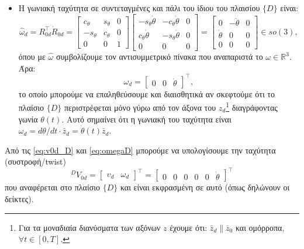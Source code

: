 \documentclass[12pt]{article} %
\numberwithin{equation}{section}  %
\begin{document}
\begin{itemize}[nolistsep, noitemsep]
    \item Η γωνιακή ταχύτητα σε συντεταγμένες και πάλι του ίδιου του πλαισίου $\{D\}$ είναι:
    \begin{equation}\label{eq:omegahatD}
        \widehat{\omega}_d = R_{0d}^{\top} \dot{R}_{0d} = 
        \begin{bmatrix}
            c_\theta  & s_\theta & 0 \\
            -s_\theta & c_\theta & 0 \\
            0 &         0      &  1
        \end{bmatrix} \begin{bmatrix}
            -s_\theta \dot\theta  &  -c_\theta \dot\theta &  0 \\
            c_\theta  \dot\theta &  -s_\theta  \dot\theta &  0 \\
            0          &  0          &  0
        \end{bmatrix} = \begin{bmatrix}
            0          &  -\dot\theta          &  0 \\
            \dot\theta          &  0           &  0 \\
            0          &  0           &  0
        \end{bmatrix}
        \in so(3),
    \end{equation}
    όπου με $\widehat{\omega}$ συμβολίζουμε τον αντισυμμετρικό πίνακα που αναπαριστά το $\omega \in \mathbb{R}^3$. Άρα:
    \begin{equation}\label{eq:omegaD}
        \omega_d = \begin{bmatrix}
            0  & 0  &  \dot\theta 
        \end{bmatrix}^{\top},
    \end{equation}
    το οποίο μπορούμε να επαληθεύσουμε και διαισθητικά αν σκεφτούμε ότι το πλαίσιο $\{D\}$ περιστρέφεται μόνο γύρω από τον άξονα του $z_d$\footnote{Για τα μοναδιαία διανύσματα  των αξόνων $z$ έχουμε ότι: $\bar{z}_d \parallel \bar{z}_0$ και ομόρροπα, $\forall t \in [0, T]$.} διαγράφοντας γωνία $\theta(t)$. 
    Αυτό σημαίνει ότι η γωνιακή του ταχύτητα είναι $\omega_d = d\theta / dt \cdot \bar{z}_d= \dot\theta(t) \bar{z}_d$.
\end{itemize}

Από τις \eqref{eq:v0d_D} και \eqref{eq:omegaD} μπορούμε να υπολογίσουμε την ταχύτητα (συστροφή/twist) 
\begin{equation}\label{eq:V0d_D}
    ^{D}V_{0d} = \begin{bmatrix} v_d & \omega_d\end{bmatrix}^{\top} =
    \begin{bmatrix} 0 & 0 & 0 & 0 & 0 & \dot\theta  \end{bmatrix}^{\top}
\end{equation}
που αναφέρεται στο πλαίσιο $\{D\}$ και είναι εκφρασμένη σε αυτό (όπως δηλώνουν οι δείκτες).
\end{document}
